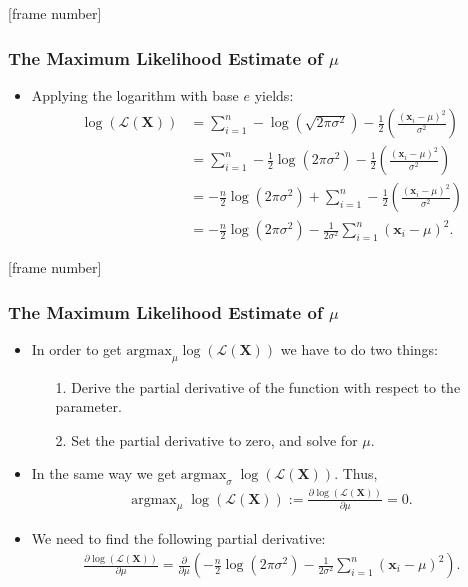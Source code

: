 \documentclass[aspectratio=169,t,xcolor=dvipsnames]{beamer}
\begin{document}
{
[frame number]
\begin{frame}
	\frametitle{The Maximum Likelihood Estimate of $\mu$}
	\begin{itemize}
		\item Applying the logarithm with base $e$ yields:
    \begin{align}
      \log\left(\mathcal{L}(\mathbf{X})\right) &= \sum_{i=1}^{n} - \log\left(\sqrt{2\pi\sigma^2}\right) -\frac{1}{2} \left( \frac{(\mathbf{x}_i-\mu)^2}{\sigma^2} \right)\\
      &= \sum_{i=1}^{n} - \frac{1}{2} \log\left(2\pi\sigma^2\right) -\frac{1}{2} \left( \frac{(\mathbf{x}_i-\mu)^2}{\sigma^2} \right) \\
      &= - \frac{n}{2} \log\left(2\pi\sigma^2\right) + \sum_{i=1}^{n} -\frac{1}{2} \left( \frac{(\mathbf{x}_i-\mu)^2}{\sigma^2} \right)\\
      &= - \frac{n}{2} \log\left(2\pi\sigma^2\right) - \frac{1}{2\sigma^2} \sum_{i=1}^{n} (\mathbf{x}_i-\mu)^2.
    \end{align}
	\end{itemize}
\end{frame}
}

{
[frame number]
\begin{frame}
	\frametitle{The Maximum Likelihood Estimate of $\mu$}
	\begin{itemize}
		\item In order to get $\text{argmax}_\mu \log\left(\mathcal{L}(\mathbf{X})\right)$ we have to do two things:
    \begin{itemize}
      \item[1.] Derive the partial derivative of the function with respect to the parameter.
      \item[2.] Set the partial derivative to zero, and solve for $\mu$.
    \end{itemize}
    \item In the same way we get $\text{argmax}_\sigma \; \log\left(\mathcal{L}(\mathbf{X})\right)$. Thus,
    \begin{align}
      \text{argmax}_\mu \; \log\left(\mathcal{L}(\mathbf{X})\right) := \frac{\partial \log\left(\mathcal{L}(\mathbf{X})\right)}{\partial \mu} = 0.
    \end{align}
    \item We need to find the following partial derivative:
    \begin{align}
      \frac{\partial \log\left(\mathcal{L}(\mathbf{X})\right)}{\partial \mu} = \frac{\partial}{\partial\mu} \left( - \frac{n}{2} \log\left(2\pi\sigma^2\right) -\frac{1}{2\sigma^2} \sum_{i=1}^{n} (\mathbf{x}_i-\mu)^2 \right).
    \end{align}
	\end{itemize}
\end{frame}
}
\end{document}
